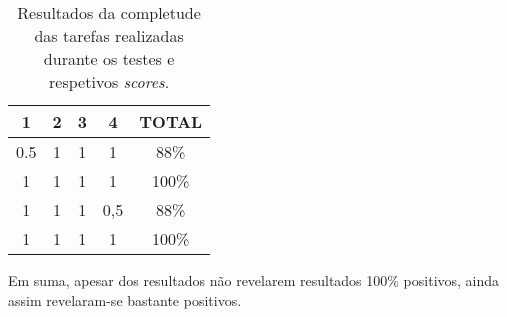 \begin{table}[H]
\centering
\caption{Resultados da completude das tarefas realizadas durante os testes e respetivos \textit{scores}.}
\begin{tabular}{ccccc}
\hline
\rowcolor[HTML]{EFEFEF} 
\textbf{1} & \textbf{2} & \textbf{3} & \textbf{4} & \textbf{TOTAL} \\ \hline
0.5        & 1          & 1          & 1          & 88\%           \\
1          & 1          & 1          & 1          & 100\%           \\
1          & 1          & 1          & 0,5        & 88\%           \\
1          & 1          & 1          & 1          & 100\%           \\ \hline
\end{tabular}
\end{table}

Em suma, apesar dos resultados não revelarem resultados 100\% positivos, ainda assim revelaram-se bastante positivos.
